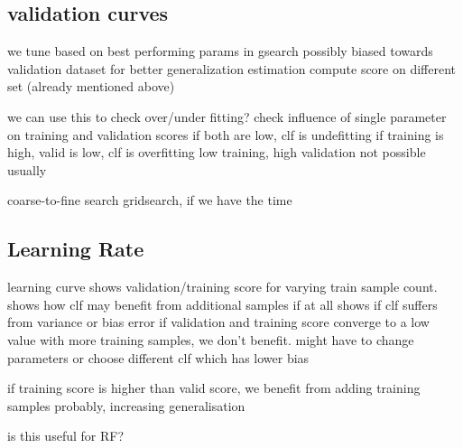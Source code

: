 %
%



\subsection{validation curves}
we tune based on best performing params in gsearch
possibly biased towards validation dataset
for better generalization estimation compute score on different set
(already mentioned above)

we can use this to check over/under fitting?
check influence of single parameter on training and validation scores
if both are low, clf is undefitting
if training is high, valid is low, clf is overfitting
low training, high validation not possible usually

coarse-to-fine search gridsearch, if we have the time

\subsection{Learning Rate}
learning curve
shows validation/training score for varying train sample count.
shows how clf may benefit from additional samples if at all
shows if clf suffers from variance or bias error
if validation and training score converge to a low value with more training samples,
we don't benefit. might have to change parameters or choose different clf which
has lower bias

if training score is higher than valid score, we benefit from adding training
samples probably, increasing generalisation

is this useful for RF?
